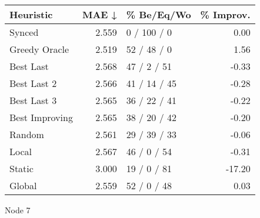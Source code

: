 \begin{tabular}{lrlr}
\toprule
\textbf{Heuristic} & \textbf{MAE ↓} & \textbf{\% Be/Eq/Wo} & \textbf{\% Improv.} \\
\midrule
            Synced &          2.559 &          0 / 100 / 0 &                0.00 \\
     Greedy Oracle &          2.519 &          52 / 48 / 0 &                1.56 \\
         Best Last &          2.568 &          47 / 2 / 51 &               -0.33 \\
       Best Last 2 &          2.566 &         41 / 14 / 45 &               -0.28 \\
       Best Last 3 &          2.565 &         36 / 22 / 41 &               -0.22 \\
    Best Improving &          2.565 &         38 / 20 / 42 &               -0.20 \\
            Random &          2.561 &         29 / 39 / 33 &               -0.06 \\
             Local &          2.567 &          46 / 0 / 54 &               -0.31 \\
            Static &          3.000 &          19 / 0 / 81 &              -17.20 \\
            Global &          2.559 &          52 / 0 / 48 &                0.03 \\
\bottomrule
\end{tabular}
\caption{Node 7}
\label{tab:hr_iid_lr01_le2_bs4_7}
